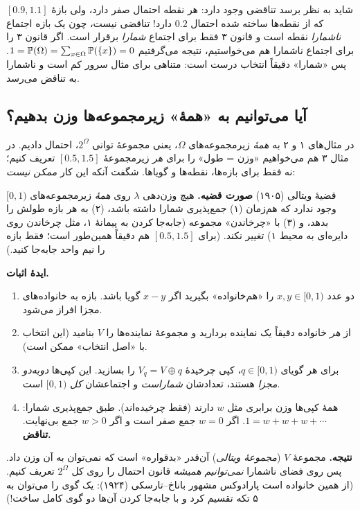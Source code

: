 \begin{warning}
شاید به نظر برسد تناقضی وجود دارد: هر نقطه احتمال صفر دارد، ولی بازهٔ $[0.9,1.1]$ که از نقطه‌ها ساخته شده احتمال $0.2$ دارد! تناقضی نیست، چون یک بازه اجتماع \emph{ناشمارا} نقطه است و قانون ۳ فقط برای اجتماع \emph{شمارا} برقرار است. اگر قانون ۳ را برای اجتماع ناشمارا هم می‌خواستیم، نتیجه می‌گرفتیم $1=\P(\Omega)=\sum_{x\in\Omega}\P(\{x\})=0$. پس «شمارا» دقیقاً انتخاب درست است: متناهی برای مثال سرور کم است و ناشمارا به تناقض می‌رسد.
\end{warning}

\subsection{آیا می‌توانیم به «همهٔ» زیرمجموعه‌ها وزن بدهیم؟}

در مثال‌های ۱ و ۲ به \emph{همهٔ} زیرمجموعه‌های $\Omega$، یعنی مجموعهٔ توانی $2^\Omega$، احتمال دادیم. در مثال ۳ هم می‌خواهیم «وزن = طول» را برای \emph{هر} زیرمجموعهٔ $[0.5,1.5]$ تعریف کنیم؛ نه فقط برای بازه‌ها، نقطه‌ها و گویاها. شگفت آنکه این کار \emph{ممکن نیست}:

\begin{moreinfo}{قضیهٔ ویتالی (۱۹۰۵)}
\textbf{صورت قضیه.} هیچ وزن‌دهی $\lambda$ روی \emph{همهٔ} زیرمجموعه‌های $[0,1)$ وجود ندارد که هم‌زمان (۱) جمع‌پذیری شمارا داشته باشد، (۲) به هر بازه طولش را بدهد، و (۳) با «چرخاندن» مجموعه (جابه‌جا کردن به پیمانهٔ ۱، مثل چرخاندن روی دایره‌ای به محیط ۱) تغییر نکند. (برای $[0.5,1.5]$ هم دقیقاً همین‌طور است؛ فقط بازه را نیم واحد جابه‌جا کنید.)

\textbf{ایدهٔ اثبات.}
\begin{enumerate}
  \item دو عدد $x,y\in[0,1)$ را «هم‌خانواده» بگیرید اگر $x-y$ گویا باشد. بازه به خانواده‌های مجزا افراز می‌شود.
  \item از \emph{هر} خانواده دقیقاً یک نماینده بردارید و مجموعهٔ نماینده‌ها را $V$ بنامید (این انتخاب با «اصل انتخاب» ممکن است).
  \item برای هر گویای $q\in[0,1)$، کپی چرخیدهٔ $V_q=V\oplus q$ را بسازید. این کپی‌ها \emph{دوبه‌دو مجزا} هستند، تعدادشان \emph{شماراست} و اجتماعشان \emph{کل} $[0,1)$ است.
  \item همهٔ کپی‌ها وزن برابری مثل $w$ دارند (فقط چرخیده‌اند). طبق جمع‌پذیری شمارا: $1=w+w+w+\cdots$. اگر $w=0$ جمع صفر است و اگر $w>0$ جمع بی‌نهایت. \textbf{تناقض.}
\end{enumerate}

\textbf{نتیجه.} مجموعهٔ $V$ (\emph{مجموعهٔ ویتالی}) آن‌قدر «بدقواره» است که نمی‌توان به آن وزن داد. پس روی فضای ناشمارا \emph{نمی‌توانیم همیشه} قانون احتمال را روی کل $2^\Omega$ تعریف کنیم.
(از همین خانواده است پارادوکس مشهور باناخ--تارسکی (۱۹۲۴): یک گوی را می‌توان به ۵ تکه تقسیم کرد و با جابه‌جا کردن آن‌ها دو گوی کامل ساخت!)
\end{moreinfo}

